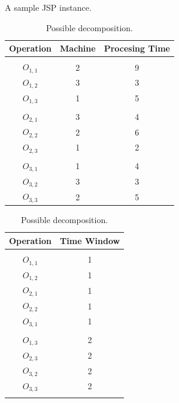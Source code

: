 \documentclass[runningheads]{llncs}
\begin{document}
\begin{table}
\begin{minipage}{.6\textwidth}
\setlength{\tabcolsep}{5.0pt}
\centering
    \caption{A sample JSP instance.}
    \label{tab1}
    \begin{tabular}{c c c}
      \textbf{Operation} & \textbf{Machine} & \textbf{Procesing Time} \\
      \hline
								\\
      $O_{1,1}$  & 2  &  9  	\\
      $O_{1,2}$  & 3  &  3  	\\
      $O_{1,3}$  & 1  &  5  	\\
								\\
      $O_{2,1}$  & 3  & 4  	\\
      $O_{2,2}$  & 2  & 6  	\\
      $O_{2,3}$  & 1  & 2  	\\
								\\
      $O_{3,1}$  & 1  & 4  	\\
      $O_{3,2}$  & 3  & 3  	\\
      $O_{3,3}$  & 2  & 5  	\\
    \end{tabular}
\end{minipage}
\begin{minipage}{.4\textwidth}
  \setlength{\tabcolsep}{5.0pt}
  \centering
    \caption{Possible decomposition.}
    \label{tab2}
    \begin{tabular}{c  c }
      \textbf{Operation} & \textbf{Time Window}  \\
      \hline
							\\
      $O_{1,1}$  & 1    	\\
      $O_{1,2}$  & 1    	\\
      $O_{2,1}$  & 1    	\\
      $O_{2,2}$  & 1   	\\
      $O_{3,1}$  & 1		\\
					    		\\
      $O_{1,3}$  & 2  	\\
      $O_{2,3}$  & 2		\\
      $O_{3,2}$  & 2    	\\
      $O_{3,3}$  & 2    	\\
      \\
    \end{tabular}
\end{minipage}
\end{table}
\end{document}
